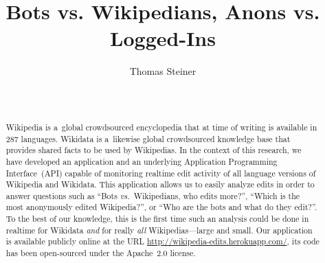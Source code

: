 \documentclass{sig-alternate-2013}
\newcommand{\inlinelistingsize}{\fontsize{8pt}{11pt}}
\let\oldurl\url
\renewcommand{\url}[1]{\inlinelistingsize\oldurl{#1}}
\begin{document}
%

\title{Bots vs. Wikipedians, Anons vs. Logged-Ins}


\author{
\alignauthor
Thomas Steiner\\
       \\
       \\
}

\maketitle
\begin{abstract}
Wikipedia is a~global crowdsourced encyclopedia
that at time of writing is available in 287 languages.
Wikidata is a~likewise global crowdsourced knowledge base
that provides shared facts to be used by Wikipedias.
In the context of this research, we have developed
an application and an underlying
Application Programming Interface~(API) capable of monitoring
realtime edit activity of all language versions
of Wikipedia and Wikidata.
This application allows us to easily analyze edits
in order to answer questions such as
``Bots \emph{vs.}\ Wikipedians, who edits more?'',
``Which is the most anonymously edited Wikipedia?'',
or ``Who are the bots and what do they edit?''.
To the best of our knowledge,
this is the first time such an analysis
could be done in realtime for Wikidata \emph{and}
for really \emph{all} Wikipedias---large and small.
Our application is available publicly online at the URL
\url{http://wikipedia-edits.herokuapp.com/},
its code has been open-sourced under the Apache~2.0 license.
\end{abstract}



\end{document}
